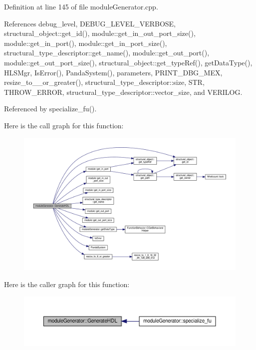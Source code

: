 Definition at line 145 of file module\+Generator.\+cpp.



References debug\+\_\+level, D\+E\+B\+U\+G\+\_\+\+L\+E\+V\+E\+L\+\_\+\+V\+E\+R\+B\+O\+SE, structural\+\_\+object\+::get\+\_\+id(), module\+::get\+\_\+in\+\_\+out\+\_\+port\+\_\+size(), module\+::get\+\_\+in\+\_\+port(), module\+::get\+\_\+in\+\_\+port\+\_\+size(), structural\+\_\+type\+\_\+descriptor\+::get\+\_\+name(), module\+::get\+\_\+out\+\_\+port(), module\+::get\+\_\+out\+\_\+port\+\_\+size(), structural\+\_\+object\+::get\+\_\+type\+Ref(), get\+Data\+Type(), H\+L\+S\+Mgr, Is\+Error(), Panda\+System(), parameters, P\+R\+I\+N\+T\+\_\+\+D\+B\+G\+\_\+\+M\+EX, resize\+\_\+to\+\_\+\_\+or\+\_\+greater(), structural\+\_\+type\+\_\+descriptor\+::size, S\+TR, T\+H\+R\+O\+W\+\_\+\+E\+R\+R\+OR, structural\+\_\+type\+\_\+descriptor\+::vector\+\_\+size, and V\+E\+R\+I\+L\+OG.



Referenced by specialize\+\_\+fu().

Here is the call graph for this function\+:
\nopagebreak
\begin{figure}[H]
\begin{center}
\leavevmode
\includegraphics[width=350pt]{d4/d94/classmoduleGenerator_a15676d465d1356f46bb9d60cfdb4e730_cgraph}
\end{center}
\end{figure}
Here is the caller graph for this function\+:
\nopagebreak
\begin{figure}[H]
\begin{center}
\leavevmode
\includegraphics[width=350pt]{d4/d94/classmoduleGenerator_a15676d465d1356f46bb9d60cfdb4e730_icgraph}
\end{center}
\end{figure}
\mbox{\label{classmoduleGenerator_a0658c03088461302ffb01e68c4f1fb28}} 
